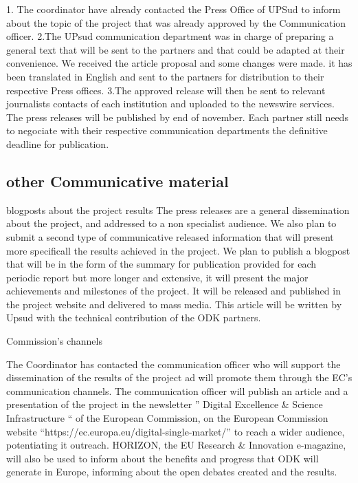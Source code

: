 \documentclass{deliverablereport}
\begin{document}
 1. The coordinator have already contacted the Press Office of UPSud to inform about the topic
 of the project that was already approved by the Communication officer. 
 2.The UPsud communication department was in charge of preparing a general text that will be sent
 to the partners and that could be adapted at their convenience. We received the article proposal 
 and some changes were made. it has been translated in English and sent to the partners 
 for distribution to their respective Press offices. 
 3.The approved release will then be sent to relevant journalists contacts of each institution 
 and uploaded to the newswire services. The press releases will be published by end of november. 
 Each partner still needs to negociate with their respective communication departments the 
 definitive deadline for publication.


\subsection{other Communicative material}

 \item blogposts about the project results
 The press releases are a general dissemination about the project, and addressed to 
 a non specialist audience. We also plan to submit a second type of communicative released 
 information that will present more specificall the results achieved in the project.
 We plan to publish a blogpost that will be in the form of the summary for publication
 provided for each periodic report but more longer and  extensive, it will present the 
 major achievements and milestones of the project. It will be released and published in 
 the project website and delivered to mass media. This article will be written by Upsud 
 with the technical contribution of the ODK partners. 
 
 
 \European Commission's channels
 
The Coordinator has contacted the communication officer  who will support the dissemination
of the results of the project ad will promote them through the EC's communication channels. 
The communication officer will publish an article and a presentation of the project in the 
newsletter ” Digital Excellence & Science Infrastructure “ of the European Commission, 
on the European Commission website “https://ec.europa.eu/digital-single-market/” to reach 
a wider audience, potentiating it outreach. 
HORIZON, the EU Research & Innovation e-magazine, will also be used to inform about 
the benefits and progress that ODK will generate in Europe, informing about 
the open debates created and the results.
\end{document}
